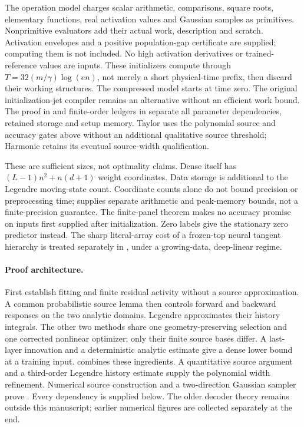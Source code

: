 \documentclass[11pt]{article}
\theoremstyle{definition}
\theoremstyle{remark}
\begin{document}
The operation model charges scalar arithmetic, comparisons, square roots,
elementary functions, real activation values and Gaussian samples as
primitives. Nonprimitive evaluators add their actual work, description and
scratch. Activation envelopes and a positive population-gap certificate are
supplied; computing them is not included. No high activation derivatives or
trained-reference values are inputs. These initializers compute through
$T=32(m/\gamma)\log(en)$, not merely a short physical-time prefix, then
discard their working structures. The compressed model starts at time zero.
The original initialization-jet compiler remains an alternative without an
efficient work bound. The proof in  and finite-order
ledgers in  separate all parameter dependencies,
retained storage and setup memory. Taylor uses the polynomial source and
accuracy gates above without an additional qualitative source threshold;
Harmonic retains its eventual source-width qualification.

These are sufficient sizes, not optimality claims. Dense itself has
$(L-1)n^2+n(d+1)$ weight coordinates. Data storage is additional to the
Legendre moving-state count. Coordinate counts alone do not bound precision
or preprocessing time;  supplies separate arithmetic
and peak-memory bounds, not a finite-precision guarantee.
The finite-panel theorem makes no accuracy promise on inputs first supplied
after initialization. Zero labels give the stationary zero predictor instead.
The sharp literal-array cost of a frozen-top neural tangent hierarchy is
treated separately in , under a growing-data,
deep-linear regime.

\paragraph{Proof architecture.}
First establish fitting and finite residual activity without a source
approximation. A common probabilistic source lemma then controls forward and
backward responses on the two analytic domains. Legendre approximates their
history integrals. The other two methods share one geometry-preserving
selection and one corrected nonlinear optimizer; only their finite source
bases differ. A last-layer innovation and a deterministic analytic estimate
give a dense lower bound at a training input.  combines
these ingredients. A quantitative source argument and a third-order Legendre
history estimate supply the polynomial width refinement. Numerical source
construction and a two-direction Gaussian sampler prove
. Every dependency is supplied below. The older
decoder theory remains outside this manuscript; earlier numerical figures
are collected separately at the end.
\end{document}
